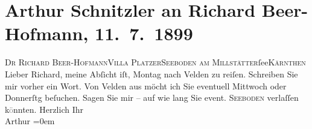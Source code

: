 

         
         \renewcommand{\erwaehntePersonen}{Personen: Richard Beer-Hofmann}
         \renewcommand{\erwaehnteOrte}{Orte: I., Innere Stadt, Kärnten, Seeboden, Velden am Wörthersee, Villa Platzer, Wien}
         \renewcommand{\erwaehnteWerke}{}
               \section[Arthur Schnitzler an Richard Beer-Hofmann, 11. 7. 1899]{ Arthur Schnitzler an Richard Beer-Hofmann, 11. 7. 1899}\nopagebreak{}\rehead{ }\begin{ledgroupsized}[t]{13cm}\normalsize\beginnumbering \toendnotes[C]{\smallbreak\pagebreak[2]} 
\pstart{}{\pb}\textsc{Dr Richard Beer-Hofmann}\pend{}\pstart{}\textsc{Villa Platzer}\pend{}\pstart{}\textsc{Seeboden am Millstätter}ſee\pend{}\pstart{}\textsc{Kärnthen}\pend{}{\bigskip}\pstart
           \noindent{}{\pb}Lieber Richard, meine Abſicht iſt, Montag nach Velden zu reiſen. Schreiben Sie mir vorher ein
               Wort. Von Velden aus möcht ich Sie eventuell
                  Mittwoch oder Donnerſtg beſuchen. Sagen Sie mir – auf
               wie lang Sie {\pb}event. \textsc{Seeboden} verlaſſen k\textcolor{gray}{ö}nnten.\pend
           \pstart
           Herzlich Ihr{\\[\baselineskip]}\spacefill\mbox{Arthur}\pend
           \leftskip=0em{}
         
         \endnumbering{}\end{ledgroupsized}  \newcommand{\dateiname}{L00937}\newcommand{\titel}{Arthur Schnitzler an Richard Beer-Hofmann, 11. 7. 1899}\newcommand{\editorInnen}{Martin Anton Müller und Gerd-Hermann Susen}
      